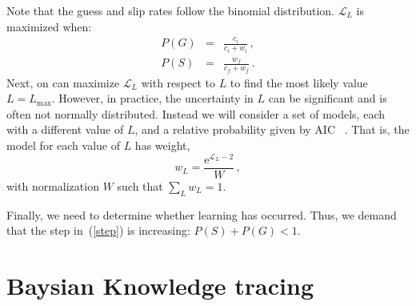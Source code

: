 \documentclass[11pt,letterpaper]{article}
\begin{document}
Note that the guess and slip rates follow the binomial distribution.
$\mathcal{L}_L$ is maximized when:
%
\begin{eqnarray}
  P(G) &=&  \frac{c_i}{c_i+w_i} \, ,\\
  P(S) &=&  \frac{w_f}{c_f+w_f} \,  .
\end{eqnarray}
%
Next, on can maximize $\mathcal{L}_L$ with respect to $L$ to find
the most likely value $L=L_\mathrm{max}$.  However, in practice, the 
uncertainty in $L$ can be significant and is often not normally
distributed.   Instead we will consider a set of models, each with a 
different value of $L$, and a relative probability given by AIC ~\cite{aic-book}.  That
is, the model for each value of $L$ has weight,
%
\begin{equation}
                   w_L = \frac{\mathrm{e}^{\mathcal{L}_L-2} }{W}\, ,
\end{equation}
with normalization $W$ such that $\sum_L w_L=1$.

Finally, we need to determine whether learning has occurred.  Thus,
we demand that the step in~(\ref{step}) is increasing: $P(S)+P(G) <1$.



\section{Baysian Knowledge tracing}
\end{document}
